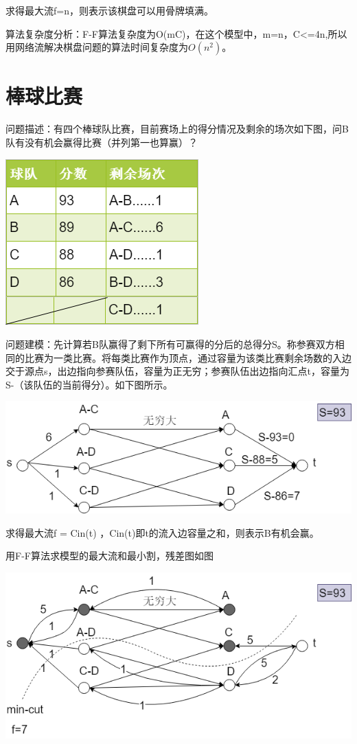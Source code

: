 求得最大流f=n，则表示该棋盘可以用骨牌填满。

算法复杂度分析：F-F算法复杂度为O(mC)，在这个模型中，m=n，C<=4n,所以用网络流解决棋盘问题的算法时间复杂度为\(O(n^2)\)。

\section{棒球比赛}
问题描述：有四个棒球队比赛，目前赛场上的得分情况及剩余的场次如下图，问B队有没有机会赢得比赛（并列第一也算赢）？

\centerline{\includegraphics[scale=0.6]{Ln11.image/networkflow5.png}}

问题建模：先计算若B队赢得了剩下所有可赢得的分后的总得分S。称参赛双方相同的比赛为一类比赛。将每类比赛作为顶点，通过容量为该类比赛剩余场数的入边交于源点s，出边指向参赛队伍，容量为正无穷；参赛队伍出边指向汇点t，容量为S-（该队伍的当前得分）。如下图所示。

\centerline{\includegraphics[scale=0.6]{Ln11.image/networkflow6.png}}

求得最大流f = Cin(t) ，Cin(t)即t的流入边容量之和，则表示B有机会赢。

用F-F算法求模型的最大流和最小割，残差图如图

\centerline{\includegraphics[scale=0.6]{Ln11.image/networkflow7.png}}

